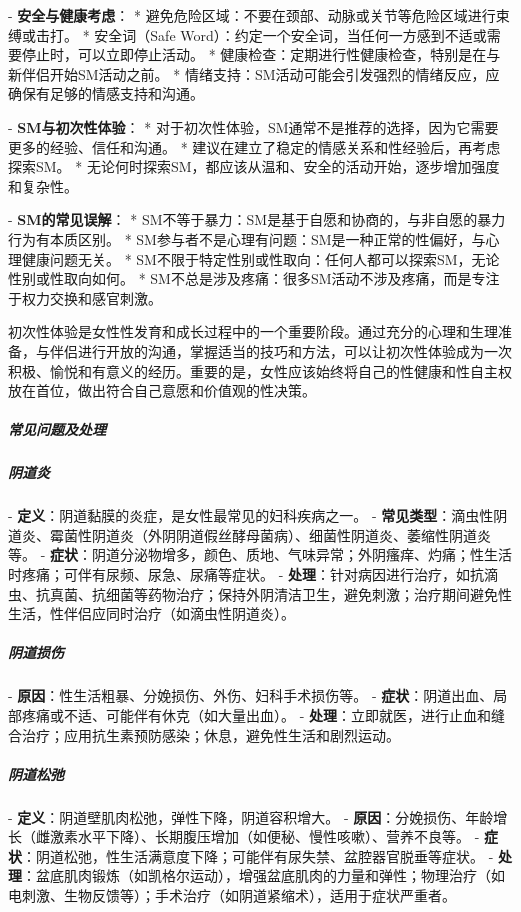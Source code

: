 \begin{enumerate}
  - \textbf{安全与健康考虑}：
    * 避免危险区域：不要在颈部、动脉或关节等危险区域进行束缚或击打。
    * 安全词（Safe Word）：约定一个安全词，当任何一方感到不适或需要停止时，可以立即停止活动。
    * 健康检查：定期进行性健康检查，特别是在与新伴侣开始SM活动之前。
    * 情绪支持：SM活动可能会引发强烈的情绪反应，应确保有足够的情感支持和沟通。

  - \textbf{SM与初次性体验}：
    * 对于初次性体验，SM通常不是推荐的选择，因为它需要更多的经验、信任和沟通。
    * 建议在建立了稳定的情感关系和性经验后，再考虑探索SM。
    * 无论何时探索SM，都应该从温和、安全的活动开始，逐步增加强度和复杂性。

  - \textbf{SM的常见误解}：
    * SM不等于暴力：SM是基于自愿和协商的，与非自愿的暴力行为有本质区别。
    * SM参与者不是心理有问题：SM是一种正常的性偏好，与心理健康问题无关。
    * SM不限于特定性别或性取向：任何人都可以探索SM，无论性别或性取向如何。
    * SM不总是涉及疼痛：很多SM活动不涉及疼痛，而是专注于权力交换和感官刺激。

初次性体验是女性性发育和成长过程中的一个重要阶段。通过充分的心理和生理准备，与伴侣进行开放的沟通，掌握适当的技巧和方法，可以让初次性体验成为一次积极、愉悦和有意义的经历。重要的是，女性应该始终将自己的性健康和性自主权放在首位，做出符合自己意愿和价值观的性决策。

\subparagraph{常见问题及处理}

\subparagraph{阴道炎}
- \textbf{定义}：阴道黏膜的炎症，是女性最常见的妇科疾病之一。
- \textbf{常见类型}：滴虫性阴道炎、霉菌性阴道炎（外阴阴道假丝酵母菌病）、细菌性阴道炎、萎缩性阴道炎等。
- \textbf{症状}：阴道分泌物增多，颜色、质地、气味异常；外阴瘙痒、灼痛；性生活时疼痛；可伴有尿频、尿急、尿痛等症状。
- \textbf{处理}：针对病因进行治疗，如抗滴虫、抗真菌、抗细菌等药物治疗；保持外阴清洁卫生，避免刺激；治疗期间避免性生活，性伴侣应同时治疗（如滴虫性阴道炎）。

\subparagraph{阴道损伤}
- \textbf{原因}：性生活粗暴、分娩损伤、外伤、妇科手术损伤等。
- \textbf{症状}：阴道出血、局部疼痛或不适、可能伴有休克（如大量出血）。
- \textbf{处理}：立即就医，进行止血和缝合治疗；应用抗生素预防感染；休息，避免性生活和剧烈运动。

\subparagraph{阴道松弛}
- \textbf{定义}：阴道壁肌肉松弛，弹性下降，阴道容积增大。
- \textbf{原因}：分娩损伤、年龄增长（雌激素水平下降）、长期腹压增加（如便秘、慢性咳嗽）、营养不良等。
- \textbf{症状}：阴道松弛，性生活满意度下降；可能伴有尿失禁、盆腔器官脱垂等症状。
- \textbf{处理}：盆底肌肉锻炼（如凯格尔运动），增强盆底肌肉的力量和弹性；物理治疗（如电刺激、生物反馈等）；手术治疗（如阴道紧缩术），适用于症状严重者。


\end{enumerate}
